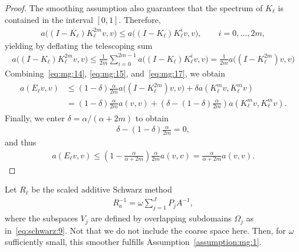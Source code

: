 \begin{proof}
  The smoothing assumption also guarantees that the spectrum of
  $K_\ell$ is contained in the interval $[0,1]$. Therefore,
  \begin{gather}
    \label{eq:mg:16}
    a\bigl((I-K_\ell) K_\ell^{2m} v,v\bigr)
    \le a\bigl((I-K_\ell) K_\ell^{i} v,v\bigr),
    \qquad i=0,\dots,2m,
  \end{gather}
  yielding by deflating the telescoping sum
  \begin{gather}
    \label{eq:mg:17}
    a\bigl((I-K_\ell) K_\ell^{2m} v,v\bigr)
    \le \frac1{2m} \sum_{i=0}^{2m-1}
    a\bigl((I-K_\ell) K_\ell^{i} v,v\bigr)
    = \frac1{2m} a\bigl((I-K_\ell^{2m}) v,v\bigr)
  \end{gather}
  Combining~\eqref{eq:mg:14}, \eqref{eq:mg:15}, and~\eqref{eq:mg:17},
  we obtain
  \begin{gather}
    \begin{split}
      a(E_\ell v,v) &\le (1-\delta)\frac\alpha{2m}
      a\bigl((I-K_\ell^{2m}) v,v\bigr)
      + \delta a(K_\ell^m v,K_\ell^m v)
      \\
      &= (1-\delta)\frac\alpha{2m} a(v,v)
      + \left(\delta - (1-\delta)\frac\alpha{2m}\right)
      a(K_\ell^m v,K_\ell^m v).
    \end{split}
  \end{gather}
  Finally, we enter $\delta=\alpha/(\alpha+2m)$ to obtain
  \begin{gather*}
    \delta - (1-\delta)\frac\alpha{2m} = 0,
  \end{gather*}
  and thus
  \begin{gather}
    \label{eq:mg:18}
    a(E_\ell v,v) \le \left(1-\frac\alpha{\alpha+2m}\right)\frac\alpha{2m}
    a(v,v) = \frac\alpha{\alpha+2m}a(v,v). 
  \end{gather}
\end{proof}

\begin{lemma}
  Let $R_\ell$ be the scaled additive Schwarz method
  \begin{gather}
    \label{eq:mg:19}
    R_a^{-1} = \omega \sum_{j=1}^J P_j A^{-1},
  \end{gather}
  where the subspaces $V_j$ are defined by overlapping subdomains
  $\Omega_j$ as in~\eqref{eq:schwarz:9}. Not that we do not include
  the coarse space here. Then, for $\omega$ sufficiently small, this
  smoother fulfills Assumption~\ref{assumption:mg:1}.
\end{lemma}

